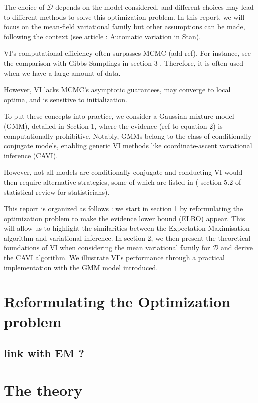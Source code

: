\documentclass{article}
\begin{document}
The choice of $\mathscr{D} $ depends on the model considered, and different choices may lead to different methods to solve this optimization problem. In this report, we will focus on the mean-field variational family but other assumptions can be made, following the context (see article : Automatic variation in Stan).

VI's computational efficiency often surpasses MCMC (add ref). For instance, see the comparison with Gibbs Samplings in section 3 . Therefore, it is often used when we have a large amount of data.

However,  VI lacks MCMC’s asymptotic guarantees, may converge to local optima, and is sensitive to initialization.
\newline

To put these concepts into practice,  we consider a Gaussian mixture model (GMM), detailed in Section 1,  where the evidence (ref to equation 2) is computationally prohibitive. 
Notably, GMMs belong to the class of conditionally conjugate models, enabling generic VI methods like coordinate-ascent variational inference (CAVI).

However, not all models are conditionally conjugate and conducting VI would then require alternative strategies, some of which are listed in ( section 5.2 of statistical review for statisticians). 
\newline

This report is organized as follows : 
we start in section 1 by reformulating the optimization problem to make the evidence lower bound (ELBO) appear. This will allow us to highlight the similarities between the Expectation-Maximisation algorithm and variational inference.
In section 2, we then present the theoretical foundations of VI when considering the mean variational family for $\mathscr{D}$ and derive the CAVI algorithm. We illustrate VI's performance through a practical implementation with the GMM model introduced. 

\newpage

\section{Reformulating the Optimization problem}
\subsection{link with EM ? }

\section{The theory}
\end{document}
